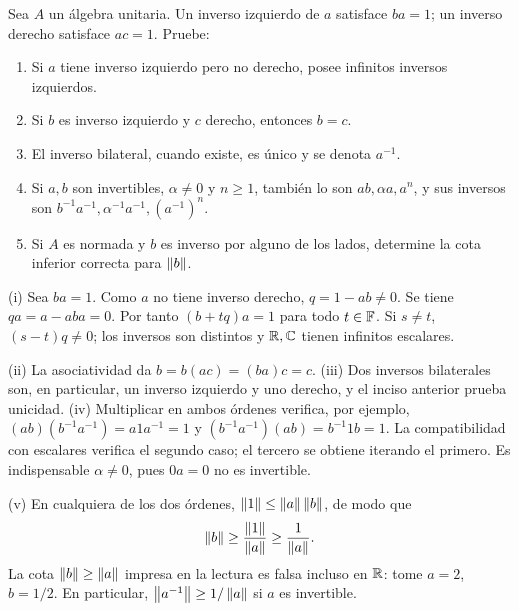 \begin{ejercicio}\label{ej:v3-l19-2}
Sea $A$ un álgebra unitaria. Un inverso izquierdo de $a$ satisface $ba=1$; un inverso derecho satisface $ac=1$. Pruebe:
\begin{enumerate}
\item Si $a$ tiene inverso izquierdo pero no derecho, posee infinitos inversos izquierdos.
\item Si $b$ es inverso izquierdo y $c$ derecho, entonces $b=c$.
\item El inverso bilateral, cuando existe, es único y se denota $a^{-1}$.
\item Si $a,b$ son invertibles, $\alpha\ne0$ y $n\geq1$, también lo son $ab,\alpha a,a^n$, y sus inversos son $b^{-1}a^{-1},\alpha^{-1}a^{-1},(a^{-1})^n$.
\item Si $A$ es normada y $b$ es inverso por alguno de los lados, determine la cota inferior correcta para $\left\lVert b\right\rVert$.
\end{enumerate}
\end{ejercicio}
\begin{solucion}
(i) Sea $ba=1$. Como $a$ no tiene inverso derecho, $q=1-ab\ne0$. Se tiene $qa=a-aba=0$. Por tanto $(b+tq)a=1$ para todo $t\in\mathbb F$. Si $s\ne t$, $(s-t)q\ne0$; los inversos son distintos y $\mathbb R,\mathbb C$ tienen infinitos escalares.

(ii) La asociatividad da $b=b(ac)=(ba)c=c$. (iii) Dos inversos bilaterales son, en particular, un inverso izquierdo y uno derecho, y el inciso anterior prueba unicidad. (iv) Multiplicar en ambos órdenes verifica, por ejemplo, $(ab)(b^{-1}a^{-1})=a1a^{-1}=1$ y $(b^{-1}a^{-1})(ab)=b^{-1}1b=1$. La compatibilidad con escalares verifica el segundo caso; el tercero se obtiene iterando el primero. Es indispensable $\alpha\ne0$, pues $0a=0$ no es invertible.

(v) En cualquiera de los dos órdenes, $\left\lVert1\right\rVert\leq\left\lVert a\right\rVert\left\lVert b\right\rVert$, de modo que
\[
 \left\lVert b\right\rVert\geq\frac{\left\lVert1\right\rVert}{\left\lVert a\right\rVert}\geq\frac1{\left\lVert a\right\rVert}.
\]
La cota $\left\lVert b\right\rVert\geq\left\lVert a\right\rVert$ impresa en la lectura es falsa incluso en $\mathbb R$: tome $a=2$, $b=1/2$. En particular, $\left\lVert a^{-1}\right\rVert\geq1/\left\lVert a\right\rVert$ si $a$ es invertible.
\end{solucion}

